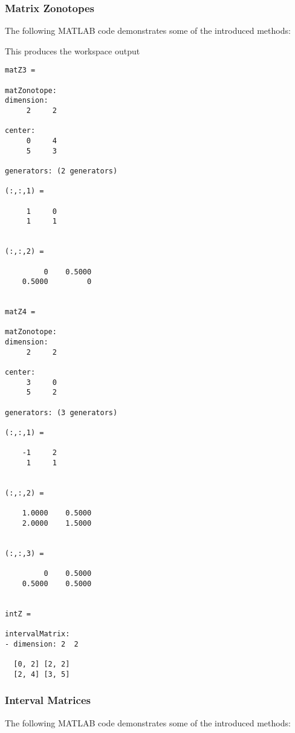 \subsubsection{Matrix Zonotopes} \label{sec:matrixZonotopeExample}

The following MATLAB code demonstrates some of the introduced methods:

{\small
}

This produces the workspace output
\begin{verbatim}
matZ3 =

matZonotope:
dimension:
     2     2

center:
     0     4
     5     3

generators: (2 generators)

(:,:,1) =

     1     0
     1     1


(:,:,2) =

         0    0.5000
    0.5000         0


matZ4 =

matZonotope:
dimension:
     2     2

center:
     3     0
     5     2

generators: (3 generators)

(:,:,1) =

    -1     2
     1     1


(:,:,2) =

    1.0000    0.5000
    2.0000    1.5000


(:,:,3) =

         0    0.5000
    0.5000    0.5000


intZ =

intervalMatrix:
- dimension: 2  2

  [0, 2] [2, 2]
  [2, 4] [3, 5]
\end{verbatim}


\subsubsection{Interval Matrices} \label{sec:intervalMatrixExample}

The following MATLAB code demonstrates some of the introduced methods:

{\small
}

